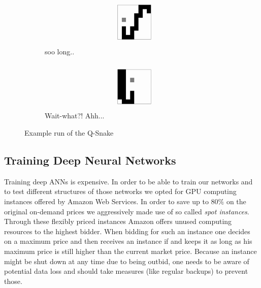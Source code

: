\documentclass[a4paper]{article}
\begin{document}
\begin{figure}
\begin{subfigure}[b]{0.24\textwidth}
        \includegraphics[width=\textwidth]{qsnake_snaps/15}
        \caption{soo long..}
    \end{subfigure}
    \begin{subfigure}[b]{0.24\textwidth}
        \includegraphics[width=\textwidth]{qsnake_snaps/16}
        \caption{Wait-what?! Ahh...}
    \end{subfigure}
    \caption{Example run of the Q-Snake}
    \label{fig:q_game}
\end{figure}



\subsection{Training Deep Neural Networks}
Training deep ANNs is expensive. In order to be able to train our networks and to test different structures of those networks we opted for GPU computing instances offered by Amazon Web Services. In order to save up to $80\%$ on the original on-demand prices we aggressively made use of so called \textit{spot instances}. Through these flexibly priced instances Amazon offers unused computing resources to the highest bidder. When bidding for such an instance one decides on a maximum price and then receives an instance if and keeps it as long as his maximum price is still higher than the current market price. Because an instance might be shut down at any time due to being outbid, one needs to be aware of potential data loss and should take measures (like regular backups) to prevent those.
\end{document}
